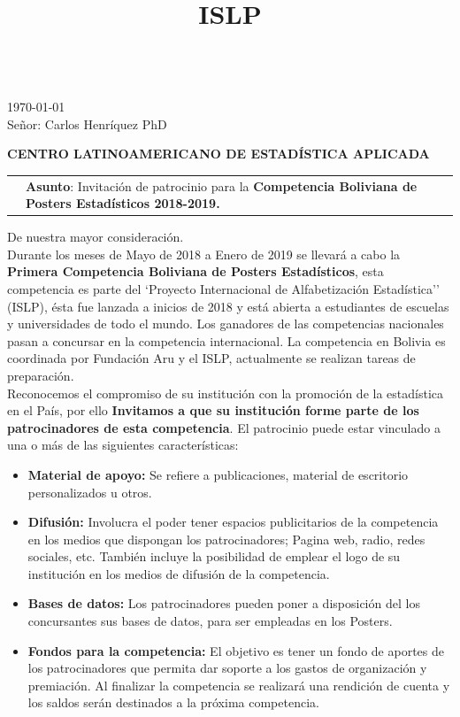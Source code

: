 \documentclass[10.9pt,a4paper]{article}
\title{ISLP}
\begin{document}
\hfill
\vspace{0.7cm}\\

\hspace{5.5cm} \today \\

Señor: Carlos Henríquez PhD 

\textbf{CENTRO LATINOAMERICANO DE ESTADÍSTICA APLICADA}
\vspace{0.1cm}\\


\begin{tabular}{lp{10cm}}
\hspace{5cm} & \textbf{Asunto}: Invitación de patrocinio para la \textbf{Competencia Boliviana de Posters Estadísticos 2018-2019.}\\
\end{tabular}

\hfill

De nuestra mayor consideración.\\

Durante los meses de Mayo de 2018 a Enero de 2019 se llevará a cabo la \textbf{Primera Competencia Boliviana de Posters Estadísticos}, esta competencia es parte del `Proyecto Internacional de Alfabetización Estadística'' (ISLP), ésta fue lanzada a inicios de 2018 y está abierta a estudiantes de escuelas y universidades de todo el mundo. Los ganadores de las competencias nacionales pasan a concursar en la competencia internacional. La competencia en Bolivia es coordinada por Fundación Aru y el ISLP, actualmente se realizan tareas de preparación.\\

Reconocemos el compromiso de su institución con la promoción de la estadística en el País, por ello \textbf{Invitamos a que su institución forme parte de los patrocinadores de esta competencia}. El patrocinio puede estar vinculado a una o más de las siguientes características:

\begin{itemize}
\item \textbf{Material de apoyo:} Se refiere a publicaciones, material de escritorio personalizados u otros. 
\item \textbf{Difusión:} Involucra el poder tener espacios publicitarios de la competencia en los medios que dispongan los patrocinadores; Pagina web, radio, redes sociales, etc. También incluye la posibilidad de emplear el logo de su institución en los medios de difusión de la competencia.
\item \textbf{Bases de datos:} Los patrocinadores pueden poner a disposición del los concursantes sus bases de datos, para ser empleadas en los Posters.
\item \textbf{Fondos para la competencia:} El objetivo es tener un fondo de aportes de los patrocinadores que permita dar soporte a los gastos de organización y premiación. Al finalizar la competencia se realizará una rendición de cuenta y los saldos serán destinados a la próxima competencia.
\end{itemize}
\end{document}
